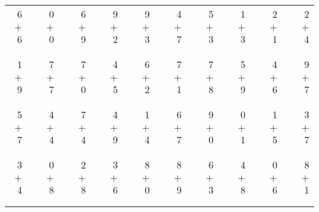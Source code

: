 \documentclass[12pt, letterpaper]{article}
\begin{document}
\begin{tabular}{rrrrrrrrrrrrrrrrrrr}
6 & & 0 & & 6 & & 9 & & 9 & & 4 & & 5 & & 1 & & 2 & & 2\\
$+$ 6 & & $+$ 0 & & $+$ 9 & & $+$ 2 & & $+$ 3 & & $+$ 7 & & $+$ 3 & & $+$ 3 & & $+$ 1 & & $+$ 4\\
\cline{1-1} \cline{3-3} \cline{5-5} \cline{7-7} \cline{9-9} \cline{11-11} \cline{13-13} \cline{15-15} \cline{17-17} \cline{19-19} \\ \\
1 & & 7 & & 7 & & 4 & & 6 & & 7 & & 7 & & 5 & & 4 & & 9\\
$+$ 9 & & $+$ 7 & & $+$ 0 & & $+$ 5 & & $+$ 2 & & $+$ 1 & & $+$ 8 & & $+$ 9 & & $+$ 6 & & $+$ 7\\
\cline{1-1} \cline{3-3} \cline{5-5} \cline{7-7} \cline{9-9} \cline{11-11} \cline{13-13} \cline{15-15} \cline{17-17} \cline{19-19} \\ \\
5 & & 4 & & 7 & & 4 & & 1 & & 6 & & 9 & & 0 & & 1 & & 3\\
$+$ 7 & & $+$ 4 & & $+$ 4 & & $+$ 9 & & $+$ 4 & & $+$ 7 & & $+$ 0 & & $+$ 1 & & $+$ 5 & & $+$ 7\\
\cline{1-1} \cline{3-3} \cline{5-5} \cline{7-7} \cline{9-9} \cline{11-11} \cline{13-13} \cline{15-15} \cline{17-17} \cline{19-19} \\ \\
3 & & 0 & & 2 & & 3 & & 8 & & 8 & & 6 & & 4 & & 0 & & 8\\
$+$ 4 & & $+$ 8 & & $+$ 8 & & $+$ 6 & & $+$ 0 & & $+$ 9 & & $+$ 3 & & $+$ 8 & & $+$ 6 & & $+$ 1\\
\cline{1-1} \cline{3-3} \cline{5-5} \cline{7-7} \cline{9-9} \cline{11-11} \cline{13-13} \cline{15-15} \cline{17-17} \cline{19-19} \\ \\
\end{tabular}
\newpage
\end{document}
